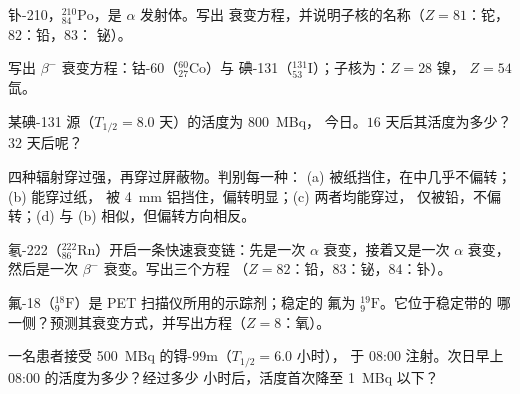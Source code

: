 \begin{exercise}[$\star$]\label{exo:g11:nucleus-radioactivity:3}
钋-210，${}^{210}_{84}\mathrm{Po}$，是 $\alpha$ 发射体。写出
衰变方程，并说明子核的名称（$Z = 81$：铊，$82$：铅，$83$：
铋）。
\end{exercise}

\begin{exercise}[$\star$]\label{exo:g11:nucleus-radioactivity:4}
写出 $\beta^-$ 衰变方程：钴-60（${}^{60}_{27}\mathrm{Co}$）与
碘-131（${}^{131}_{53}\mathrm{I}$）；子核为：$Z = 28$ 镍，
$Z = 54$ 氙。
\end{exercise}

\begin{exercise}[$\star$]\label{exo:g11:nucleus-radioactivity:5}
某碘-131 源（$T_{1/2} = 8.0$ 天）的活度为 \qty{800}{MBq}，
今日。$16$ 天后其活度为多少？$32$ 天后呢？
\end{exercise}

\begin{exercise}[$\star\star$]\label{exo:g11:nucleus-radioactivity:6}
四种辐射穿过强，再穿过屏蔽物。判别每一种：
(a) 被纸挡住，在中几乎不偏转；(b) 能穿过纸，
被 \qty{4}{mm} 铝挡住，偏转明显；(c) 两者均能穿过，
仅被铅，不偏转；(d) 与 (b) 相似，但偏转方向相反。
\end{exercise}

\begin{exercise}[$\star\star$]\label{exo:g11:nucleus-radioactivity:7}
氡-222（${}^{222}_{86}\mathrm{Rn}$）开启一条快速衰变链：先是一次 $\alpha$
衰变，接着又是一次 $\alpha$ 衰变，然后是一次 $\beta^-$ 衰变。写出三个方程
（$Z = 82$：铅，$83$：铋，$84$：钋）。
\end{exercise}

\begin{exercise}[$\star\star$]\label{exo:g11:nucleus-radioactivity:8}
氟-18（${}^{18}_{9}\mathrm{F}$）是 PET 扫描仪所用的示踪剂；稳定的
氟为 ${}^{19}_{9}\mathrm{F}$。它位于稳定带的
哪一侧？预测其衰变方式，并写出方程（$Z = 8$：氧）。
\end{exercise}

\begin{exercise}[$\star\star$]\label{exo:g11:nucleus-radioactivity:9}
一名患者接受 \qty{500}{MBq} 的锝-99m（$T_{1/2} = 6.0$ 小时），
于 08:00 注射。次日早上 08:00 的活度为多少？经过多少
小时后，活度首次降至 \qty{1}{MBq} 以下？
\end{exercise}

